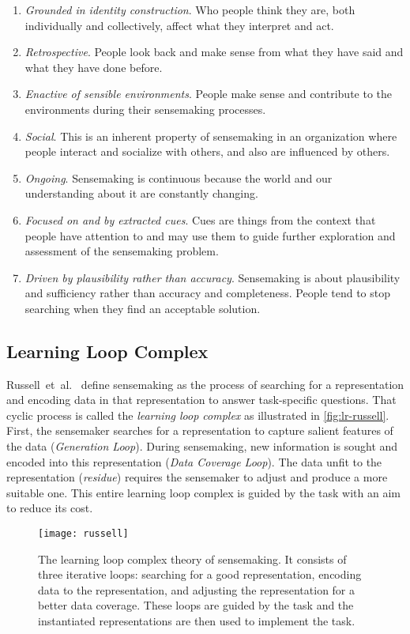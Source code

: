 \begin{enumerate}
	\item \emph{Grounded in identity construction}. Who people think they are, both individually and collectively, affect what they interpret and act.
	\item \emph{Retrospective}. People look back and make sense from what they have said and what they have done before.
	\item \emph{Enactive of sensible environments}. People make sense and contribute to the environments during their sensemaking processes.
	\item \emph{Social}. This is an inherent property of sensemaking in an organization where people interact and socialize with others, and also are influenced by others.
	\item \emph{Ongoing}. Sensemaking is continuous because the world and our understanding about it are constantly changing.
	\item \emph{Focused on and by extracted cues}. Cues are things from the context that people have attention to and may use them to guide further exploration and assessment of the sensemaking problem.
	\item \emph{Driven by plausibility rather than accuracy}. Sensemaking is about plausibility and sufficiency rather than accuracy and completeness. People tend to stop searching when they find an acceptable solution.
\end{enumerate}

\subsection{Learning Loop Complex}
Russell~et~al.~\cite{Russell1993} define sensemaking as the process of searching for a representation and encoding data in that representation to answer task-specific questions. That cyclic process is called the \emph{learning loop complex} as illustrated in \autoref{fig:lr-russell}. First, the sensemaker searches for a representation to capture salient features of the data (\emph{Generation Loop}). During sensemaking, new information is sought and encoded into this representation (\emph{Data Coverage Loop}). The data unfit to the representation (\emph{residue}) requires the sensemaker to adjust and produce a more suitable one. This entire learning loop complex is guided by the task with an aim to reduce its cost. 

\begin{figure}[!htb]
	\centering
	\texttt{[image: russell]}
	\caption{The learning loop complex theory of sensemaking. It consists of three iterative loops: searching for a good representation, encoding data to the representation, and adjusting the representation for a better data coverage. These loops are guided by the task and the instantiated representations are then used to implement the task. }
	\label{fig:lr-russell}
\end{figure}


